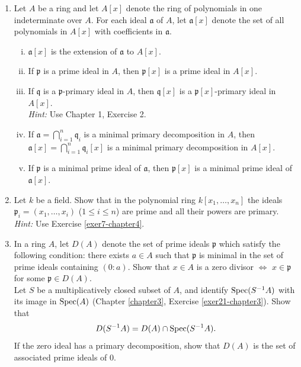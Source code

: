 \begin{enumerate}
    \item \label{exer7-chapter4}Let $A$ be a ring and let $A[x]$ denote the ring of polynomials in one indeterminate over $A$. For each ideal $\mathfrak{a}$ of $A$, let $\mathfrak{a}[x]$ denote the set of all polynomials in $A[x]$ with coefficients in $\mathfrak{a}$.
    \begin{enumerate}[i)]
        \item $\mathfrak{a}[x]$ is the extension of $\mathfrak{a}$ to $A[x]$.
        \item If $\mathfrak{p}$ is a prime ideal in $A$, then $\mathfrak{p}[x]$ is a prime ideal in $A[x]$.
        \item If $\mathfrak{q}$ is a $\mathfrak{p}$-primary ideal in $A$, then $\mathfrak{q}[x]$ is a $\mathfrak{p}[x]$-primary ideal in $A[x]$.\\
        \textit{Hint:} Use Chapter 1, Exercise 2.
        \item If $\mathfrak{a} = \bigcap_{i=1}^n \mathfrak{q}_i$ is a minimal primary decomposition in $A$, then $\mathfrak{a}[x] = \bigcap_{i=1}^n \mathfrak{q}_i[x]$ is a minimal primary decomposition in $A[x]$.
        \item If $\mathfrak{p}$ is a minimal prime ideal of $\mathfrak{a}$, then $\mathfrak{p}[x]$ is a minimal prime ideal of $\mathfrak{a}[x]$.
    \end{enumerate}

    \item \label{exer8-chapter4}Let $k$ be a field. Show that in the polynomial ring $k[x_1, \ldots, x_n]$ the ideals $\mathfrak{p}_i = (x_1, \ldots, x_i)$ ($1 \leq i \leq n$) are prime and all their powers are primary.\\
    \textit{Hint:} Use Exercise \ref{exer7-chapter4}.

    \item \label{exer9-chapter4}In a ring $A$, let $D(A)$ denote the set of prime ideals $\mathfrak{p}$ which satisfy the following condition: there exists $a \in A$ such that $\mathfrak{p}$ is minimal in the set of prime ideals containing $(0 : a)$. Show that $x \in A$ is a zero divisor $\iff$ $x \in \mathfrak{p}$ for some $\mathfrak{p} \in D(A)$.\\
    Let $S$ be a multiplicatively closed subset of $A$, and identify $\operatorname{Spec}(S^{-1}A)$ with its image in $\operatorname{Spec}(A)$ (Chapter \ref{chapter3}, Exercise \ref{exer21-chapter3}). Show that
    \[
    D(S^{-1}A) = D(A) \cap \operatorname{Spec}(S^{-1}A).
    \]
    If the zero ideal has a primary decomposition, show that $D(A)$ is the set of associated prime ideals of $0$.


\end{enumerate}
